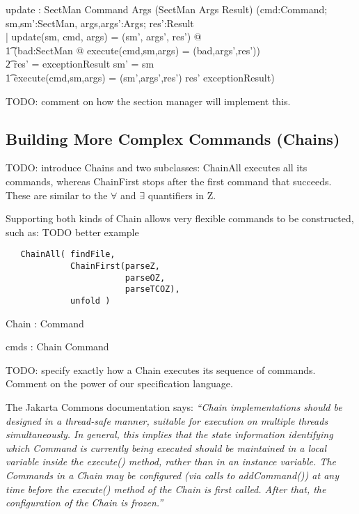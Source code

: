 \documentclass{llncs} %
\begin{document}
\begin{axdef}
  update : SectMan \cross Command \cross Args 
       \fun (SectMan \cross Args \cross Result)
\where
  (\forall cmd:Command; sm,sm':SectMan, args,args':Args; res':Result\\
  | update(sm, cmd, args) = (sm', args', res') @ \\
  \t1 (\exists bad:SectMan @ execute(cmd,sm,args) = (bad,args',res')) \land\\
  \t2 res' = exceptionResult \land sm' = sm \land \\
  \t1 \lor execute(cmd,sm,args) = (sm',args',res') \land
           res' \neq exceptionResult)
\end{axdef}

TODO: comment on how the section manager will implement this.


\subsection{Building More Complex Commands (Chains)}

TODO: introduce Chains and two subclasses: ChainAll executes
all its commands, whereas ChainFirst stops after the first
command that succeeds.  These are similar to the $\forall$
and $\exists$ quantifiers in Z.

Supporting both kinds of Chain allows very flexible commands
to be constructed, such as:  TODO better example
\begin{verbatim}
   ChainAll( findFile, 
             ChainFirst(parseZ, 
                        parseOZ,
                        parseTCOZ), 
             unfold )
\end{verbatim}

\begin{axdef}
  Chain : \power Command
\end{axdef}

\begin{axdef}
  cmds : Chain \fun \seq Command
\end{axdef}

TODO: specify exactly how a Chain executes its sequence of commands.
Comment on the power of our specification language.

The Jakarta Commons documentation says: \emph{``Chain implementations
  should be designed in a thread-safe manner, suitable for execution on
  multiple threads simultaneously. In general, this implies that the state
  information identifying which Command is currently being executed should
  be maintained in a local variable inside the execute() method, rather
  than in an instance variable. The Commands in a Chain may be configured
  (via calls to addCommand()) at any time before the execute() method of
  the Chain is first called. After that, the configuration of the Chain is
  frozen.''}
\end{document}
